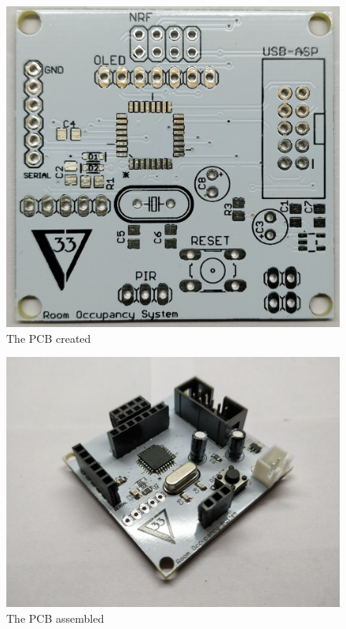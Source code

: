 \documentclass[journal]{IEEEtran}
\begin{document}
\begin{figure}[ht]
	\centering
	\includegraphics[scale=0.06]{PCB_1.jpg}
	\caption{The PCB created}
	\label{fig_pcb}
\end{figure}

\begin{figure}[ht]
	\centering
	\includegraphics[scale=0.03]{1__30_.jpg}
	\caption{The PCB assembled}
	\label{fig_pcb}
\end{figure}
\end{document}
